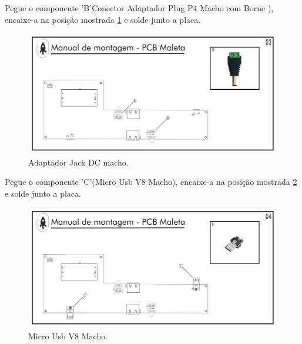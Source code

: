 \par Pegue o componente 'B'Conector Adaptador Plug P4 Macho com Borne ), encaixe-a na posição mostrada \ref{fig:PCBMALETA Jack} e solde junto a placa.
\begin{figure}[H]
  \centering
  \includegraphics[width=\textwidth]{Figuras/MALETA/Pg-03---PL-01.png}
  \caption{Adaptador Jack DC macho.}
  \label{fig:PCBMALETA Jack}
\end{figure}


\par Pegue o componente 'C'(Micro Usb V8 Macho), encaixe-a na posição mostrada \ref{fig:PCBMALETA Micro Usb} e solde junto a placa.

\begin{figure}[H]
  \centering
  \includegraphics[width=\textwidth]{Figuras/MALETA/Pg-04---PL-01.png}
  \caption{Micro Usb V8 Macho.}
  \label{fig:PCBMALETA Micro Usb}
\end{figure}

\newpage

